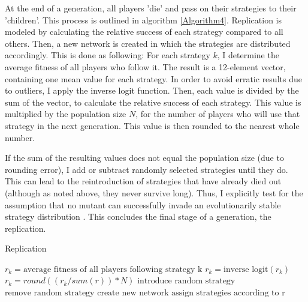 \documentclass[12pt]{article}
\begin{document}
At the end of a generation, all players 'die' and pass on their strategies to their 'children'. This process is outlined in algorithm \ref{Algorithm4}. Replication is modeled by calculating the relative success of each strategy compared to all others. Then, a new network is created in which the strategies are distributed accordingly. This is done as following: For each strategy $k$, I determine the average fitness of all players who follow it. The result is a 12-element vector, containing one mean value for each strategy. In order to avoid erratic results due to outliers, I apply the inverse logit function. Then, each value is divided by the sum of the vector, to calculate the relative success of each strategy. This value is multiplied by the population size $N$, for the number of players who will use that strategy in the next generation. This value is then rounded to the nearest whole number.

If the sum of the resulting values does not equal the population size (due to rounding error), I add or subtract randomly selected strategies until they do. This can lead to the reintroduction of strategies that have already died out (although as noted above, they never survive long). Thus, I explicitly test for the assumption that no mutant can successfully invade an evolutionarily stable strategy distribution \citep{hamilton1964_2}. This concludes the final stage of a generation, the replication.

\begin{algorithm}
\caption{Replication}
\label{Algorithm4}
	\begin{algorithmic}
		\State $r_k=\text{average fitness of all players following strategy k}$
		\State $r_k=\text{inverse logit}(r_k)$
		\EndFor
		\State $r_k=round((r_{k}/sum(r))*N)$
		\EndFor
		\State $\text{introduce random strategy}$
		\EndWhile
		\State $\text{remove random strategy}$
		\EndWhile
		\State $\text{create new network}$
		\State $\text{assign strategies according to r}$
		\EndFunction
	\end{algorithmic}
\end{algorithm}
\end{document}
